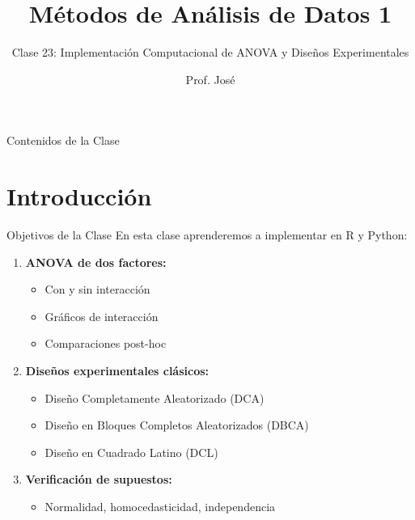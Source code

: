\documentclass[aspectratio=169]{beamer}
\title[MAD1 - Clase 23]{Métodos de Análisis de Datos 1}
\subtitle{Clase 23: Implementación Computacional de ANOVA y Diseños Experimentales}
\author{Prof. José}
\institute{Departamento de Matemática \\ Universidad Nacional del Sur}
\date{}
\begin{document}
\begin{frame}
\titlepage
\end{frame}

\begin{frame}{Contenidos de la Clase}
\tableofcontents
\end{frame}

\section{Introducción}

\begin{frame}{Objetivos de la Clase}
En esta clase aprenderemos a implementar en R y Python:

\begin{enumerate}
\item \textbf{ANOVA de dos factores:}
\begin{itemize}
\item Con y sin interacción
\item Gráficos de interacción
\item Comparaciones post-hoc
\end{itemize}

\vspace{0.2cm}

\item \textbf{Diseños experimentales clásicos:}
\begin{itemize}
\item Diseño Completamente Aleatorizado (DCA)
\item Diseño en Bloques Completos Aleatorizados (DBCA)
\item Diseño en Cuadrado Latino (DCL)
\end{itemize}

\vspace{0.2cm}

\item \textbf{Verificación de supuestos:}
\begin{itemize}
\item Normalidad, homocedasticidad, independencia
\end{itemize}
\end{enumerate}
\end{frame}
\end{document}
